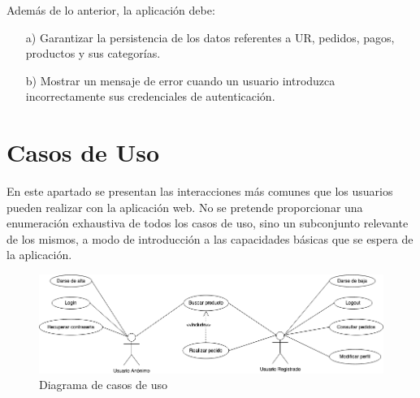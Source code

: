 \documentclass[a4paper,12pt,twoside,openright]{report}
\begin{document}
            Además de lo anterior, la aplicación debe:
            \begin{enumerate}
                \item[a)] Garantizar la persistencia de los datos referentes a UR, pedidos, pagos, productos y sus categorías.
                \item[b)] Mostrar un mensaje de error cuando un usuario introduzca incorrectamente sus credenciales de autenticación.
            \end{enumerate}

        \section{Casos de Uso}
            En este apartado se presentan las interacciones más comunes que los usuarios pueden realizar con la aplicación web. No se pretende proporcionar una enumeración exhaustiva de todos los casos de uso, sino un subconjunto relevante de los mismos, a modo de introducción a las capacidades básicas que se espera de la aplicación.

            \begin{figure}[htb!]
                \centering
                \includegraphics[width=\textwidth]{use-case_diagram}
                \caption{Diagrama de casos de uso}
                \label{fig:use-case_diagram}
            \end{figure}
\end{document}
